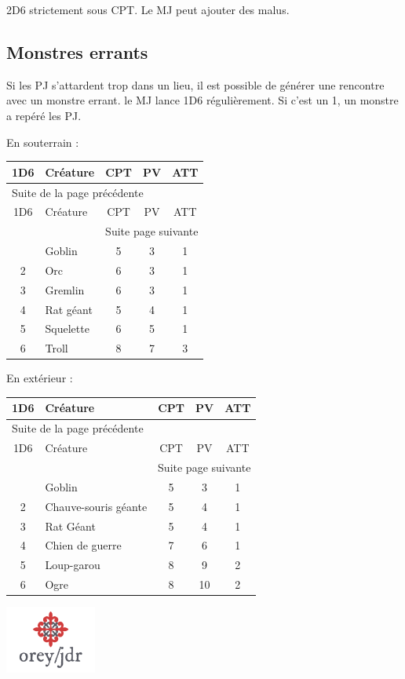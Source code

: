 \documentclass[a4paper, 11pt, twoside]{article}
\begin{document}
2D6 strictement sous CPT. Le MJ peut ajouter des malus.

\subsection{Monstres errants}
\label{sec:org753e204}

Si les PJ s'attardent trop dans un lieu, il est possible de générer une rencontre avec un monstre errant. le MJ lance 1D6 régulièrement. Si c'est un 1, un monstre a repéré les PJ.

En souterrain :

\begin{longtable}{c|l|c|c|c}
1D6 & Créature & CPT & PV & ATT\\
\hline
\endfirsthead
\multicolumn{5}{l}{Suite de la page précédente} \\
\hline

1D6 & Créature & CPT & PV & ATT \\

\hline
\endhead
\hline\multicolumn{5}{r}{Suite page suivante} \\
\endfoot
\endlastfoot
\hline
1 & Goblin & 5 & 3 & 1\\
2 & Orc & 6 & 3 & 1\\
3 & Gremlin & 6 & 3 & 1\\
4 & Rat géant & 5 & 4 & 1\\
5 & Squelette & 6 & 5 & 1\\
6 & Troll & 8 & 7 & 3\\
\end{longtable}

En extérieur :

\begin{longtable}{c|l|c|c|c}
1D6 & Créature & CPT & PV & ATT\\
\hline
\endfirsthead
\multicolumn{5}{l}{Suite de la page précédente} \\
\hline

1D6 & Créature & CPT & PV & ATT \\

\hline
\endhead
\hline\multicolumn{5}{r}{Suite page suivante} \\
\endfoot
\endlastfoot
\hline
1 & Goblin & 5 & 3 & 1\\
2 & Chauve-souris géante & 5 & 4 & 1\\
3 & Rat Géant & 5 & 4 & 1\\
4 & Chien de guerre & 7 & 6 & 1\\
5 & Loup-garou & 8 & 9 & 2\\
6 & Ogre & 8 & 10 & 2\\
\end{longtable}


\vfill

\begin{center}
\includegraphics[width=3cm]{logo-orey-big.png}
\end{center}
\end{document}
